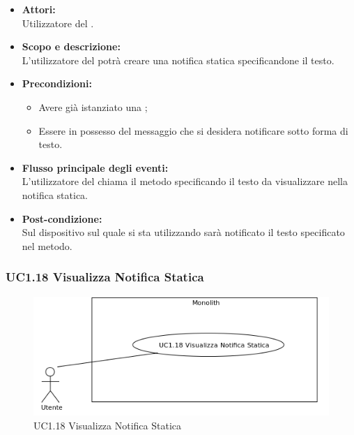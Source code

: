 \begin{itemize}
	\item \textbf{Attori:}
	\\Utilizzatore del .
	\item \textbf{Scopo e descrizione:} 
	\\L’utilizzatore del  potrà creare una notifica statica specificandone il testo.
	\item \textbf{Precondizioni:}
	\begin{itemize}
		\item Avere già istanziato una ;
		\item Essere in possesso del messaggio che si desidera notificare sotto forma di testo.
	\end{itemize}
	\item \textbf{Flusso principale degli eventi:}
	\\L’utilizzatore del  chiama il metodo specificando il testo da visualizzare nella notifica statica.
	\item \textbf{Post-condizione:}
	\\Sul dispositivo sul quale si sta utilizzando  sarà notificato il testo specificato nel metodo.
\end{itemize}

\subsubsection{UC1.18 Visualizza Notifica Statica} \label{UC1.18}

\begin{figure}[H]
	\centering
	\includegraphics[width=15cm]{../../documenti/AnalisiDeiRequisiti/Diagrammi_img/uc1_18.png}
	\caption{UC1.18 Visualizza Notifica Statica}
\end{figure}

